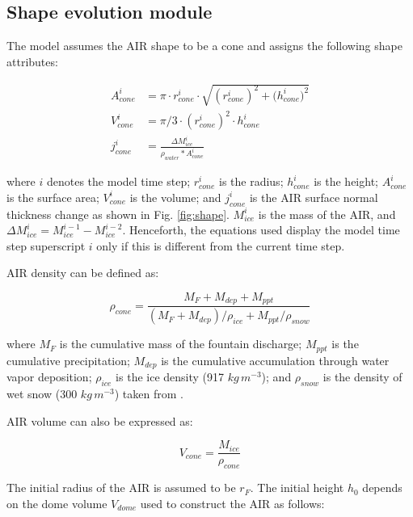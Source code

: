 \subsection{Shape evolution module} \label{sec:shape}

The model assumes the \ac{AIR} shape to be a cone and assigns the following shape attributes:

\begin{subequations}
	\begin{align}
		\label{eq:A}
		A_{cone}^i & = \pi \cdot r_{cone}^i \cdot \sqrt{{(r_{cone}^i)}^2 + {(h_{cone}^i})^ 2} \\
		\label{eq:V}
		V_{cone}^i & = \pi/3 \cdot {(r_{cone}^i)}^2 \cdot h_{cone}^i                          \\
		\label{eq:thickness}
		j_{cone}^i & =\frac{\Delta M_{ice}^i}{\rho_{water}* A_{cone}^i}
	\end{align}
\end{subequations}

where $i$ denotes the model time step; $r_{cone}^i$ is the radius; $h_{cone}^i$ is the height; $A_{cone}^i$ is
the surface area; $V_{cone}^i$ is the volume; and $j_{cone}^i$ is the \ac{AIR} surface normal thickness change as shown
in Fig. \ref{fig:shape}. $M_{ice}^i$ is the mass of the \ac{AIR}, and $\Delta M_{ice}^i = M_{ice}^{i-1} -
	M_{ice}^{i-2}$. Henceforth, the equations used display the model time step superscript $i$ only if this is different
from the current time step.

AIR density can be defined as:

\begin{equation}
	\rho_{cone} = \frac{M_{F} + M_{dep} + M_{ppt}}{(M_{F} + M_{dep})/\rho_{ice} + M_{ppt}/\rho_{snow}}
\end{equation}

where $M_F$ is the cumulative mass of the fountain discharge; $M_{ppt}$ is the cumulative precipitation;
$M_{dep}$ is the cumulative accumulation through water vapor deposition; $\rho_{ice}$ is the ice density (917
$kg\,m^{-3}$); and $\rho_{snow}$ is the density of wet snow (300 $kg\,m^{-3}$) taken from
\cite{cuffeyPhysicsGlaciers2010}.

AIR volume can also be expressed as:

\begin{equation} V_{cone} =\frac{M_{ice}} {\rho_{cone}} \label{eq:V1} \end{equation}

The initial radius of the \ac{AIR} is assumed to be $r_F$. The initial height $h_0$ depends on the dome volume
$V_{dome}$ used to construct the \ac{AIR} as follows:

